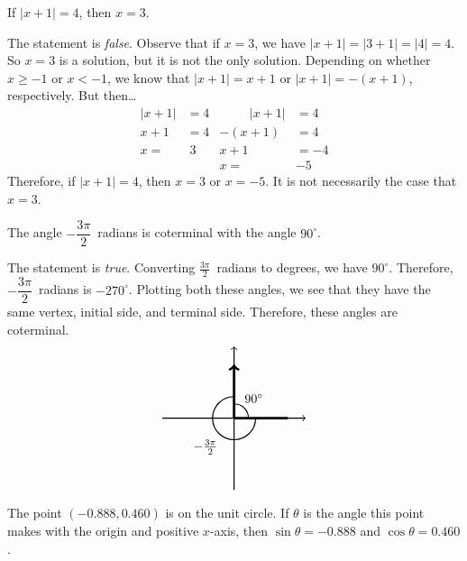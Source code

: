 \documentclass[11pt,letterpaper]{article}
\begin{document}
 If $|x + 1|= 4$, then $x= 3$. \pspace

\sol The statement is \textit{false}. Observe that if $x= 3$, we have $|x + 1|= |3 + 1|= |4|= 4$. So $x= 3$ is a solution, but it is not the only solution. Depending on whether $x \geq -1$ or $x < -1$, we know that $|x + 1|= x + 1$ or $|x + 1|= -(x + 1)$, respectively. But then\dots
	\[
	\begin{aligned}
	|x + 1|&= 4 &\hspace{1cm} |x + 1|&= 4 \\
	x + 1&= 4 & -(x + 1)&= 4 \\
	x= &\; 3 & x + 1&= -4 \\
	& & x= &-5
	\end{aligned}
	\]
Therefore, if $|x + 1|= 4$, then $x= 3$ or $x= -5$. It is not necessarily the case that $x= 3$. \pvspace{1.3cm}



 The angle $-\dfrac{3\pi}{2}$~radians is coterminal with the angle $90^\circ$. \pspace

\sol The statement is \textit{true}. Converting $\frac{3\pi}{2}$~radians to degrees, we have $90^\circ$. Therefore, $-\dfrac{3\pi}{2}$~radians is $-270^\circ$. Plotting both these angles, we see that they have the same vertex, initial side, and terminal side. Therefore, these angles are coterminal. 
	\[
	\begin{tikzpicture}
	\draw[line width=0.03cm,->] (-2,0) -- (2,0);				%
	\draw[line width=0.03cm,->] (0,-2) -- (0,2);				%
	
	\draw[line width=0.07cm,->] (0,0) -- (0,1.5);			%
	\draw[line width=0.07cm] (0,0) -- (1.5,0);				%
	
	\draw[line width=0.03cm] (0.4,0) arc (0:90:0.4); \node at (0.55,0.55) {$90^\circ$};		%
	\draw[line width=0.03cm] (0.6,0) arc (0:-270:0.6); \node at (-0.8,-0.8) {$-\frac{3\pi}{2}$};	%
	\end{tikzpicture}
	\]



\newpage



 The point $(-0.888,0.460)$ is on the unit circle. If $\theta$ is the angle this point makes with the origin and positive $x$-axis, then $\sin \theta= -0.888$ and $\cos \theta= 0.460$. \pspace
\end{document}
